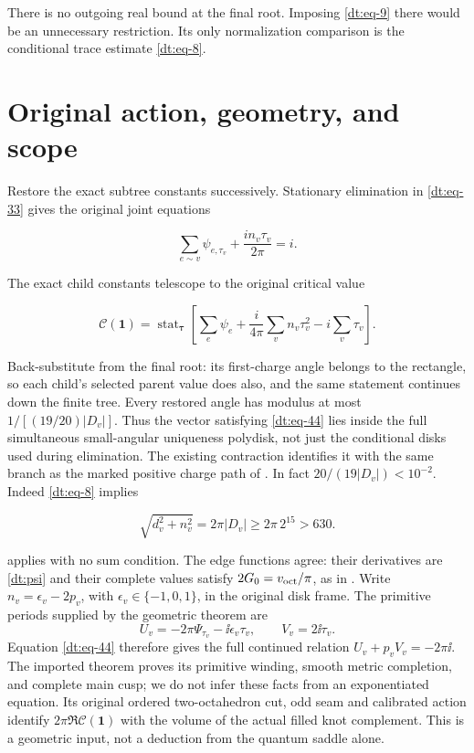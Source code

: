 There is no outgoing real bound at the final root. Imposing \eqref{dt:eq-9} there
would be an unnecessary restriction. Its only normalization comparison
is the conditional trace estimate \eqref{dt:eq-8}.

\section{Original action, geometry, and scope}\label{dt:sec-7}

Restore the exact subtree constants successively. Stationary
elimination in \eqref{dt:eq-33} gives the original joint equations

\begin{equation}\label{dt:eq-44}
\sum_{e\sim v}\psi_{e,\tau_v}
                      +\frac{in_v\tau_v}{2\pi}=i.
\end{equation}

The exact child constants telescope to the original critical value

\begin{equation}\label{dt:eq-45}
\mathcal C(\mathbf1)=\operatorname{stat}_{\boldsymbol\tau}
 \left[\sum_e\psi_e+
       \frac{i}{4\pi}\sum_vn_v\tau_v^2-i\sum_v\tau_v\right].
\end{equation}

Back-substitute from the final root: its first-charge angle belongs to
the rectangle, so each child's selected parent value does also, and
the same statement continues down the finite tree. Every restored angle
has modulus at most \(1/[(19/20)|D_v|]\). Thus the vector satisfying
\eqref{dt:eq-44} lies inside the full simultaneous small-angular uniqueness
polydisk, not just the conditional disks used during elimination.
The existing contraction identifies it with the same branch as the
marked positive charge path of \cite[Theorem~1.1]{Geometry}. In fact
\(20/(19|D_v|)<10^{-2}\). Indeed
\eqref{dt:eq-8} implies

\begin{equation}\label{dt:eq-46}
\sqrt{d_v^2+n_v^2}=2\pi|D_v|\ge 2\pi\,2^{15}>630.
\end{equation}

\cite[Theorem~1.1]{Geometry} applies with no sum condition.
The edge functions agree: their derivatives are \eqref{dt:psi} and
their complete values satisfy \(2G_0=v_{\rm oct}/\pi\), as in
\cite[Section~7]{Summed}. Write \(n_v=\epsilon_v-2p_v\), with
\(\epsilon_v\in\{-1,0,1\}\), in the original disk frame. The
primitive periods supplied by the geometric theorem are
\[
 U_v=-2\pi\Psi_{\tau_v}-\ii\epsilon_v\tau_v,
 \qquad V_v=2\ii\tau_v.
\]
Equation \eqref{dt:eq-44} therefore gives the full continued relation
\(U_v+p_vV_v=-2\pi\ii\). The imported theorem proves its primitive
winding, smooth metric completion, and complete main cusp; we do not
infer these facts from an exponentiated equation.
Its original ordered two-octahedron cut, odd seam and calibrated action identify \(2\pi\Re\mathcal C(\mathbf1)\) with the volume of the actual
filled knot complement. This is a geometric input, not a deduction
from the quantum saddle alone.

